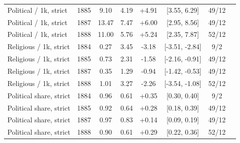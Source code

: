 \begin{table}[h]
\begin{tabular}{@{}llcccccc@{}}
Political / 1k, strict & 1885 & 9.10 & 4.19 & +4.91 & [3.55, 6.29] & 49/12 \\
Political / 1k, strict & 1887 & 13.47 & 7.47 & +6.00 & [2.95, 8.56] & 49/12 \\
Political / 1k, strict & 1888 & 11.00 & 5.76 & +5.24 & [2.35, 7.87] & 52/12 \\
Religious / 1k, strict & 1884 & 0.27 & 3.45 & -3.18 & [-3.51, -2.84] & 9/2 \\
Religious / 1k, strict & 1885 & 0.73 & 2.31 & -1.58 & [-2.16, -0.91] & 49/12 \\
Religious / 1k, strict & 1887 & 0.35 & 1.29 & -0.94 & [-1.42, -0.53] & 49/12 \\
Religious / 1k, strict & 1888 & 1.01 & 3.27 & -2.26 & [-3.54, -1.08] & 52/12 \\
Political share, strict & 1884 & 0.96 & 0.61 & +0.35 & [0.30, 0.40] & 9/2 \\
Political share, strict & 1885 & 0.92 & 0.64 & +0.28 & [0.18, 0.39] & 49/12 \\
Political share, strict & 1887 & 0.97 & 0.83 & +0.14 & [0.09, 0.19] & 49/12 \\
Political share, strict & 1888 & 0.90 & 0.61 & +0.29 & [0.22, 0.36] & 52/12 \\
\bottomrule\end{tabular}\label{tab:yearlex}\end{table}
